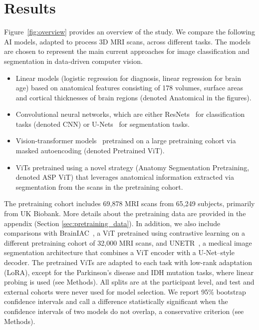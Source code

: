 \documentclass[pdflatex,sn-nature]{sn-jnl}%
\newif\ifhighlight
\newcommand{\rev}[1]{\ifhighlight{\color{blue}{}#1}\else#1\fi}%
\newcommand{\revdel}[1]{\ifhighlight{\color{red}\sout{#1}}\fi}
\theoremstyle{thmstyleone}%
\theoremstyle{thmstyletwo}%
\theoremstyle{thmstylethree}%
\begin{document}
\section*{Results}\label{result}

Figure~\ref{fig:overview} provides an overview of the study. We compare the following AI models, adapted to process 3D MRI scans, across different tasks. The models are chosen to represent the main current approaches for image classification and segmentation in data-driven computer vision.   

\begin{itemize}
\item Linear \revdel{logistic-regression }models \rev{(logistic regression for diagnosis, linear regression for brain age)} based on anatomical features consisting of 178 volumes\rev{, surface areas and cortical thicknesses} \revdel{and surfaces }of brain regions (denoted Anatomical in the figures).
\item Convolutional neural networks, which are either ResNets~\citep{he2015deepresiduallearningimage} for classification tasks (denoted CNN) or U-Nets~\citep{ronneberger2015u} for segmentation tasks.
\item Vision-transformer models~\citep{dosovitskiy2020image} pretrained on a large pretraining cohort via masked autoencoding (denoted Pretrained ViT).
\item ViTs pretrained using a novel strategy (Anatomy Segmentation Pretraining, denoted ASP ViT) that leverages anatomical information extracted via segmentation from the scans in the pretraining cohort.
\end{itemize}

The pretraining cohort includes 69,878 MRI scans from 65,249 subjects, primarily from UK Biobank\citep{sudlow2015uk}. More details about the pretraining data are provided in the appendix (Section \ref{sec:pretraining_data}). In addition, we also include comparisons with BrainIAC~\citep{tak2024foundation}, a ViT pretrained using contrastive learning on a different pretraining cohort of 32,000 MRI scans, and UNETR~\citep{hatamizadeh2022unetr}, a medical image segmentation architecture that combines a ViT encoder with a U-Net–style decoder. \rev{The pretrained ViTs are adapted to each task with low-rank adaptation (LoRA), except for the Parkinson's disease and IDH mutation tasks, where linear probing is used (see Methods). All splits are at the participant level, and test and external cohorts were never used for model selection. We report 95\% bootstrap confidence intervals and call a difference statistically significant when the confidence intervals of two models do not overlap, a conservative criterion (see Methods).}     
\end{document}
